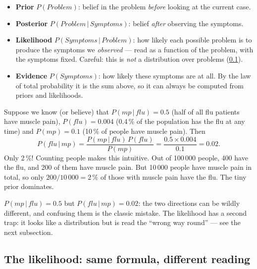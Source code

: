 \documentclass[11pt, oneside]{book}
\newcommand{\Prob}{\mathbb{P}}           %
\newcommand{\given}{\,\vert\,}           %
\newcommand{\vn}[1]{\mathit{#1}}         %
\let\originalsubsection\subsection
\renewcommand{\subsection}{\Needspace{6\baselineskip}\originalsubsection}
\begin{document}
\begin{itemize}
  \item \textbf{Prior} $P(\vn{Problem})$: belief in the problem \emph{before}
    looking at the current case.
  \item \textbf{Posterior} $P(\vn{Problem} \given \vn{Symptoms})$: belief
    \emph{after} observing the symptoms.
  \item \textbf{Likelihood} $P(\vn{Symptoms} \given \vn{Problem})$: how likely
    each possible problem is to produce the symptoms we \emph{observed} ---
    read as a function of the problem, with the symptoms fixed. Careful: this
    is \emph{not} a distribution over problems (\cref{sec:likelihood}).
  \item \textbf{Evidence} $P(\vn{Symptoms})$: how likely these symptoms are at
    all. By the law of total probability it is the sum above, so it can always
    be computed from priors and likelihoods.
\end{itemize}

\begin{exbox}[title={Does the person with muscle pain have the flu?}, unbreakable]
Suppose we know (or believe) that $P(\vn{mp} \given \vn{flu}) = 0.5$ (half of
all flu patients have muscle pain), $P(\vn{flu}) = 0.004$ (0.4\,\% of the
population has the flu at any time) and $P(\vn{mp}) = 0.1$ (10\,\% of people
have muscle pain). Then
\[
P(\vn{flu} \given \vn{mp}) = \frac{P(\vn{mp} \given \vn{flu})\,P(\vn{flu})}{P(\vn{mp})}
= \frac{0.5 \times 0.004}{0.1} = 0.02 .
\]
Only 2\,\%! Counting people makes this intuitive. Out of 100\,000 people, 400
have the flu, and 200 of them have muscle pain. But 10\,000 people have muscle
pain in total, so only $200 / 10\,000 = 2\,\%$ of those with muscle pain have
the flu. The tiny prior dominates.
\end{exbox}

\begin{notebox}[title={Do not flip the conditional}, unbreakable]
$P(\vn{mp} \given \vn{flu}) = 0.5$ but $P(\vn{flu} \given \vn{mp}) = 0.02$:
the two directions can be wildly different, and confusing them is the classic
mistake. The likelihood has a second trap: it looks like a distribution but is
read the ``wrong way round'' --- see the next subsection.
\end{notebox}

\subsection{The likelihood: same formula, different reading}
\label{sec:likelihood}
\end{document}
